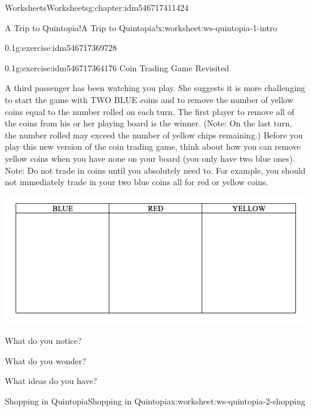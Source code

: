 \documentclass[twoside,11pt,]{book}
\begin{document}
\begin{chapterptx}{Worksheets}{}{Worksheets}{}{}{g:chapter:idm546717411424}
\begin{worksheet-section-numberless}{A Trip to Quintopia!}{}{A Trip to Quintopia!}{}{}{x:worksheet:ws-quintopia-1-intro}
\begin{divisionexercise}{1}{}{0.1}{g:exercise:idm546717369728}
\begin{sidebyside}{1}{0.05}{0.05}{0}
\begin{sbspanel}{0.9}
\end{sbspanel}%
\end{sidebyside}%
\end{divisionexercise}%
\clearpage
\begin{divisionexercise}{2}{}{0.1}{g:exercise:idm546717364176}%
Coin Trading Game Revisited%
\par
A third passenger has been watching you play.  She suggests it is more challenging to start the game with TWO BLUE coins and to remove the number of yellow coins equal to the number rolled on each turn.  The first player to remove all of the coins from his or her playing board is the winner.  (Note: On the last turn, the number rolled may exceed the number of yellow chips remaining.)  Before you play this new version of the coin trading game, think about how you can remove yellow coins when you have none on your board (you only have two blue ones).  Note: Do not trade in coins until you absolutely need to.  For example, you should not immediately trade in your two blue coins all for red or yellow coins.%
\begin{sidebyside}{1}{0.05}{0.05}{0}%
\begin{sbspanel}{0.9}%
\includegraphics[width=1\linewidth]{images/quintopia-table.png}
\end{sbspanel}%
\end{sidebyside}%
\par
What do you notice?%
\par
What do you wonder?%
\par
What ideas do you have?%
\end{divisionexercise}%
\end{worksheet-section-numberless}
\restoregeometry
%
%
\typeout{************************************************}
\typeout{************************************************}
%
\begin{worksheet-section-numberless}{Shopping in Quintopia}{}{Shopping in Quintopia}{}{}{x:worksheet:ws-quintopia-2-shopping}

\end{worksheet-section-numberless}
\end{chapterptx}
\end{document}
